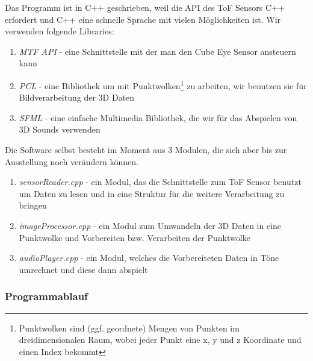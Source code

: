 \documentclass[a4paper,12pt,ngerman]{scrartcl}
\begin{document}
Das Programm ist in C++ geschrieben, weil die API des ToF Sensors C++ erfordert und C++ eine schnelle
Sprache mit vielen Möglichkeiten ist. Wir verwenden folgende Libraries:
\begin{enumerate}
	\item \textit{MTF API} - eine Schnittstelle mit der man den Cube Eye Sensor ansteuern kann
	\item \textit{PCL} - eine Bibliothek um mit Punktwolken\footnote{Punktwolken sind (ggf. geordnete) Mengen von Punkten im dreidimensionalen Raum, 
		wobei jeder Punkt eine x, y und z Koordinate und einen Index bekommt} zu arbeiten, wir benutzen 
	sie für Bildverarbeitung der 3D Daten
	\item \textit{SFML} - eine einfache Multimedia Bibliothek, 
	die wir für das Abspielen von 3D Sounds verwenden 
\end{enumerate} 
Die Software selbst besteht im Moment aus 3 Modulen, die sich aber bis zur Ausstellung noch verändern 
können.
\begin{enumerate}
	\item \textit{sensorReader.cpp} - ein Modul, das die Schnittstelle zum ToF Sensor benutzt um Daten zu 
	lesen und in eine Struktur für die weitere Verarbeitung zu bringen
	\item \textit{imageProcessor.cpp} - ein Modul zum Umwandeln der 3D Daten in eine Punktwolke und 
	Vorbereiten bzw. Verarbeiten der Punktwolke
	\item \textit{audioPlayer.cpp} - ein Modul, welches die Vorbereiteten Daten in Töne umrechnet und 
	diese dann abspielt
\end{enumerate}

\subsubsection{Programmablauf}
\end{document}
